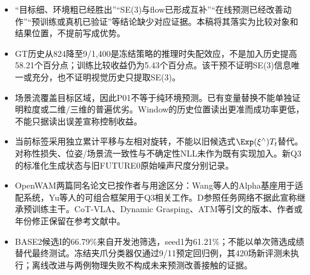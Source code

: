 \begin{itemize}
\item “目标细、环境粗已经胜出”“SE(3)与flow已形成互补”“在线预测已经改善动作”“预训练或真机已验证”等结论缺少对应证据。本稿将其落实为比较对象和结果位置，不提前写成优势。
\item GT历史从824降至9/1,400是冻结策略的推理时失配效应，不是加入历史提高58.21个百分点；训练比较收益仍为5.43个百分点。该干预不证明SE(3)信息唯一或充分，也不证明视觉历史只提取SE(3)。
\item 场景流覆盖目标区域，因此P01不等于纯环境预测。已有变量替换不能单独证明粒度或二维/三维的普遍优劣。Window的历史位置读出更准而成功率更低，不能只据读出误差宣称控制收益。
\item 当前标签采用独立累计平移与左相对旋转，不能以旧候选式$\Exp(\xi^\wedge)T_t$替代。对称性损失、位姿/场景流一致性与不确定性NLL未作为既有实现加入。新Q3的标准化生成状态与旧FUTURE0原始噪声尺度分别记录。
\item OpenWAM两篇同名论文已按作者与用途区分：Wang等人的Alpha基座用于适配系统，Yu等人的可组合框架用于Q3相关工作。D参照任务网络不据此宣称继承预训练主干。CoT-VLA、Dynamic Grasping、ATM等引文的版本、作者或年份修正保留在参考文献中。
\item BASE2候选I的66.79\%来自开发池筛选，seed1为61.21\%；不能以单次筛选成绩替代最终测试。冻结夹爪分类器仅通过9/11预定回归例，其420场新评测未执行；离线改进与两例物理失败不构成未来预测改善接触的证据。
\end{itemize}
